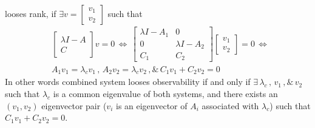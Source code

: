 \documentclass[twoside]{article}
\begin{document}
looses rank, if $\exists v = \begin{bmatrix} v_1 \\ v_2 \end{bmatrix}$ such that 
%
%
\begin{align*}
	&\left[ \begin{array}{c} \lambda I - A \\ \hline C \end{array} \right] v  = 0 
	\, \iff \,  \left[ \begin{array}{c|c} \lambda I - A_1 & 0 \\ \hline 0 &  \lambda I - A_2 \\ \hline  C_1 & C_2 \end{array} \right] \begin{bmatrix} v_1 \\ v_2 \end{bmatrix} = 0
	\, \iff \, 
	\\
	&A_1 v_1 = \lambda_c v_1 \, , \, A_2 v_2 = \lambda_c v_2 \, , \& \, C_1 v_1 + C_2 v_2 = 0
\end{align*}
%
In other words combined system looses observability if and only if $\exists \, \lambda_c  \, , \, v_1 \, ,\& \, v_2$ such that 
$\lambda_c$ is a common eigenvalue of both systems, and there exists an $(v_1,v_2)$ eigenvector pair ($v_i$ is an eigenvector of $A_i$ associated with $\lambda_c$)
such that $C_1 v_1 + C_2 v_2 = 0$.
\end{document}
